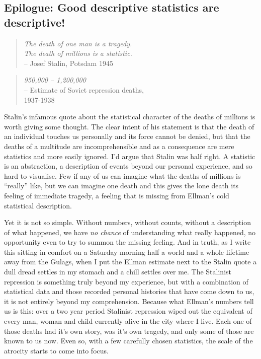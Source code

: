 \subsection{Epilogue: Good descriptive statistics are descriptive!}

\begin{quote}
{\it The death of one man is a tragedy.\\  The death of millions is a statistic.}\\
\hspace*{2cm} -- Josef Stalin, Potsdam 1945
\end{quote}

\begin{quote}
{\it 950,000 -- 1,200,000} \\
\hspace*{2cm} -- Estimate of Soviet repression deaths, \\ \hspace*{2.3cm} 1937-1938 \parencite{Ellman2002}
\end{quote}


Stalin's infamous quote about the statistical character of the deaths of millions is worth giving some thought. The clear intent of his statement is that the death of an individual touches us personally and its force cannot be denied, but that the deaths of a multitude are incomprehensible and as a consequence are mere statistics and more easily ignored. I'd argue that Stalin was half right. A statistic is an abstraction, a description of events beyond our personal experience, and so hard to visualise. Few if any of us can imagine what the deaths of millions is ``really'' like, but we can imagine one death and this gives the lone death its feeling of immediate tragedy, a feeling that is missing from Ellman's cold statistical description.

Yet it is not so simple. Without numbers, without counts, without a description of what happened, we have {\it no chance} of understanding what really happened, no opportunity even to try to summon the missing feeling. And in truth, as I write this sitting in comfort on a Saturday morning half a world and a whole lifetime away from the Gulags, when I put the Ellman estimate next to the Stalin quote a dull dread settles in my stomach and a chill settles over me. The Stalinist repression is something truly beyond my experience, but with a combination of statistical data and those recorded personal histories that have come down to us, it is not entirely beyond my comprehension. Because what Ellman's numbers tell us is this: over a two year period Stalinist repression wiped out the equivalent of every man, woman and child currently alive in the city where I live. Each one of those deaths had it's own story, was it's own tragedy, and only some of those are known to us now. Even so, with a few carefully chosen statistics, the scale of the atrocity starts to come into focus.  

